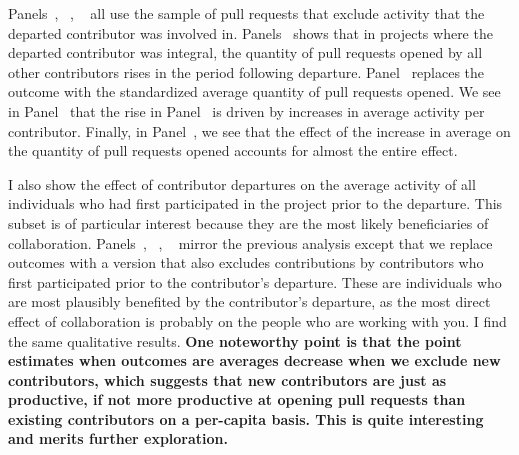 \documentclass[12pt,notitlepage]{article}
\begin{document}
Panels~, ~, ~ all use the sample of pull requests that exclude activity that the departed contributor was involved in. Panels~ shows that in projects where the departed contributor was integral, the quantity of pull requests opened by all other contributors rises in the period following departure. Panel~ replaces the outcome with the standardized average quantity of pull requests opened. We see in Panel~ that the rise in Panel~ is driven by increases in average activity per contributor. Finally, in Panel~, we see that the effect of the increase in average on the quantity of pull requests opened accounts for almost the entire effect.


I also show the effect of contributor departures on the average activity of all individuals who had first participated in the project prior to the departure. This subset is of particular interest because they are the most likely beneficiaries of collaboration. 
Panels~, ~, ~ mirror the previous analysis except that we replace outcomes with a version that also excludes contributions by contributors who first participated prior to the contributor's departure. These are individuals who are most plausibly benefited by the contributor's departure, as the most direct effect of collaboration is probably on the people who are working with you. I find the same qualitative results. \textbf{One noteworthy point is that the point estimates when outcomes are averages decrease when we exclude new contributors, which suggests that new contributors are just as productive, if not more productive at opening pull requests than existing contributors on a per-capita basis. This is quite interesting and merits further exploration.}
\end{document}
